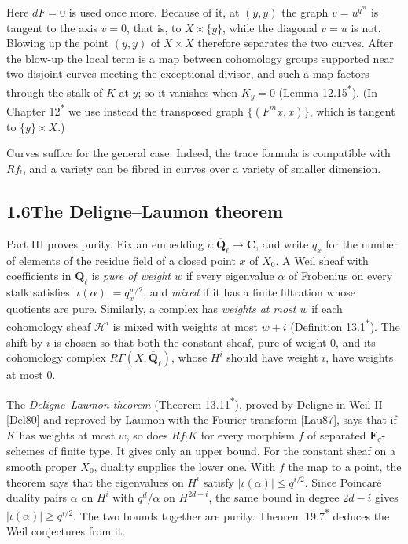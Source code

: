 \documentclass[11pt]{article}
\newcommand{\bpout}[1]{#1\textsuperscript{\hyperlink{bp-outside}{\ensuremath{\ast}}}}
\begin{document}
Here \(dF=0\) is used once more. Because of it, at \((y,y)\) the graph \(v=u^{q^m}\) is tangent to the axis \(v=0\), that is, to \(X\times\{y\}\), while the diagonal \(v=u\) is not. Blowing up the point \((y,y)\) of \(X\times X\) therefore separates the two curves. After the blow-up the local term is a map between cohomology groups supported near two disjoint curves meeting the exceptional divisor, and such a map factors through the stalk of \(K\) at \(y\); so it vanishes when \(K_{\bar y}=0\) (Lemma \bpout{12.15}). (In Chapter \bpout{12} we use instead the transposed graph \(\{(F^mx,x)\}\), which is tangent to \(\{y\}\times X\).)

Curves suffice for the general case. Indeed, the trace formula is compatible with \(Rf_!\), and a variety can be fibred in curves over a variety of smaller dimension.


\subsection*{\texorpdfstring{1.6\quad The Deligne–Laumon theorem}{1.6 The Deligne–Laumon theorem}}
\label{bp13}%
\label{bp14}%
Part III proves purity. Fix an embedding \(\iota:\overline{\mathbf Q}_\ell\to\mathbf C\), and write \(q_x\) for the number of elements of the residue field of a closed point \(x\) of \(X_0\). A Weil sheaf with coefficients in \(\overline{\mathbf Q}_\ell\) is \emph{pure of weight \(w\)} if every eigenvalue \(\alpha\) of Frobenius on every stalk satisfies \(|\iota(\alpha)|=q_x^{w/2}\), and \emph{mixed} if it has a finite filtration whose quotients are pure. Similarly, a complex has \emph{weights at most \(w\)} if each cohomology sheaf \(\mathcal H^i\) is mixed with weights at most \(w+i\) (Definition \bpout{13.1}). The shift by \(i\) is chosen so that both the constant sheaf, pure of weight \(0\), and its cohomology complex \(R\Gamma(X,\overline{\mathbf Q}_\ell)\), whose \(H^i\) should have weight \(i\), have weights at most \(0\).

The \emph{Deligne–Laumon theorem} (Theorem \bpout{13.11}), proved by Deligne in Weil II [\hyperref[bp29]{Del80}] and reproved by Laumon with the Fourier transform [\hyperref[bp30]{Lau87}], says that if \(K\) has weights at most \(w\), so does \(Rf_!K\) for every morphism \(f\) of separated \(\mathbf F_q\)-schemes of finite type. It gives only an upper bound. For the constant sheaf on a smooth proper \(X_0\), duality supplies the lower one. With \(f\) the map to a point, the theorem says that the eigenvalues on \(H^i\) satisfy \(|\iota(\alpha)|\le q^{i/2}\). Since Poincaré duality pairs \(\alpha\) on \(H^i\) with \(q^d/\alpha\) on \(H^{2d-i}\), the same bound in degree \(2d-i\) gives \(|\iota(\alpha)|\ge q^{i/2}\). The two bounds together are purity. Theorem \bpout{19.7} deduces the Weil conjectures from it.
\end{document}
